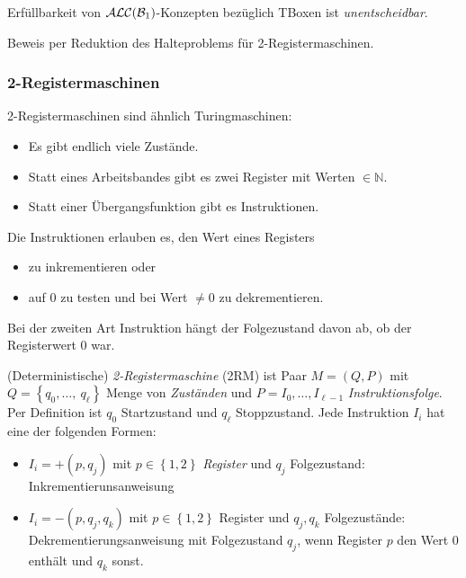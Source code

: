 \begin{theorem}
    Erfüllbarkeit von $\mathcal{A}\mathcal{L}\mathcal{C}(\mathcal{B}_1)$-Konzepten bezüglich TBoxen ist \emph{unentscheidbar}.
\end{theorem}

Beweis per Reduktion des Halteproblems für 2-Registermaschinen.

\subsubsection{2-Registermaschinen}

2-Registermaschinen sind ähnlich Turingmaschinen:
\begin{itemize}
    \item Es gibt endlich viele Zustände.
    \item Statt eines Arbeitsbandes gibt es zwei Register mit Werten $\in \mathbb{N}$.
    \item Statt einer Übergangsfunktion gibt es Instruktionen.
\end{itemize}
Die Instruktionen erlauben es, den Wert eines Registers

\begin{itemize}
    \item zu inkrementieren oder
    \item auf 0 zu testen und bei Wert $\neq 0$ zu dekrementieren.
\end{itemize}
Bei der zweiten Art Instruktion hängt der Folgezustand davon ab, ob der Registerwert 0 war.

\begin{definition}[2-Registermaschine]
(Deterministische) \emph{2-Registermaschine} (2RM) ist Paar
$M = \left( Q,P \right)$ mit
$Q = \left\{ q_0,\ldots,\ q_\ell \right\}$ Menge von \emph{Zuständen}
und $P = I_{0},\ldots,I_{\ell - 1}$ \emph{Instruktionsfolge}. Per
Definition ist $q_0$ Startzustand und $q_\ell$ Stoppzustand. Jede
Instruktion $I_{i}$ hat eine der folgenden Formen:

\begin{itemize}
\item
  $I_{i} = + (p,q_j)$ mit $p \in \left\{ 1,2 \right\}$
  \emph{Register} und $q_{j}$ Folgezustand: Inkrementierunsanweisung
\item
  $I_{i} = - (p,q_{j},q_{k})$ mit $p \in \left\{ 1,2 \right\}$
  Register und $q_{j},q_{k}$ Folgezustände: Dekrementierungsanweisung
  mit Folgezustand $q_{j}$, wenn Register $p$ den Wert $0$ enthält
  und $q_{k}$ sonst.
\end{itemize}
\end{definition}

